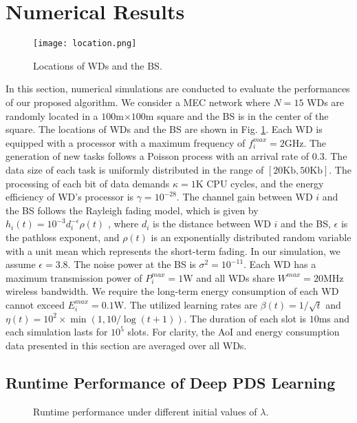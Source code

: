 \documentclass[lettersize, journal]{IEEEtran}
\begin{document}
\section{Numerical Results} \label{section:simulation}
\begin{figure}[t]
    \centering
    \texttt{[image: location.png]}
    \caption{Locations of WDs and the BS.}
    \label{fig:location}
\end{figure}
In this section, numerical simulations are conducted to evaluate the performances of our proposed algorithm.
We consider a MEC network where $N=15$ WDs are randomly located in a $100$m$\times 100$m square
and the BS is in the center of the square.
The locations of WDs and the BS are shown in Fig. \ref{fig:location}.
Each WD is equipped with a processor with a maximum frequency of $f^{max}_i = 2$GHz.
The generation of new tasks follows a Poisson process with an arrival rate of $0.3$.
The data size of each task is uniformly distributed in the range of $[20\mbox{Kb}, 50\mbox{Kb}]$.
The processing of each bit of data demands $\kappa = 1\mbox{K}$ CPU cycles,
and the energy efficiency of WD's processor is $\gamma = 10^{-28}$.
The channel gain between WD $i$ and the BS follows the Rayleigh fading model,
which is given by $h_i(t) = 10^{-3} d^{-\epsilon}_i \rho(t)$ \cite{wu2019online, ju2013throughput},
where $d_i$ is the distance between WD $i$ and the BS,
$\epsilon$ is the pathloss exponent,
and $\rho(t)$ is an exponentially distributed random variable with a unit mean which represents the short-term fading.
In our simulation, we assume $\epsilon = 3.8$.
The noise power at the BS is $\sigma^2 = 10^{-11}$.
Each WD has a maximum transmission power of $P^{max}_i = 1\mbox{W}$ and all WDs share $W^{max} = 20$MHz wireless bandwidth.
We require the long-term energy consumption of each WD cannot exceed $E^{max}_i = 0.1$W.
The utilized learning rates are $\beta(t) = 1/\sqrt{t}$ and $\eta(t) = 10^2 \times \min(1, 10/\log(t+1))$.
The duration of each slot is $10$ms and each simulation lasts for $10^5$ slots.
For clarity, the AoI and energy consumption data presented in this section are averaged over all WDs.

\subsection{Runtime Performance of Deep PDS Learning}
\begin{figure}[t]
\centering
{}
\vfil
{}
\caption{Runtime performance under different initial values of $\lambda$.}
\label{time_dynamics_lam}
\end{figure}
\end{document}
